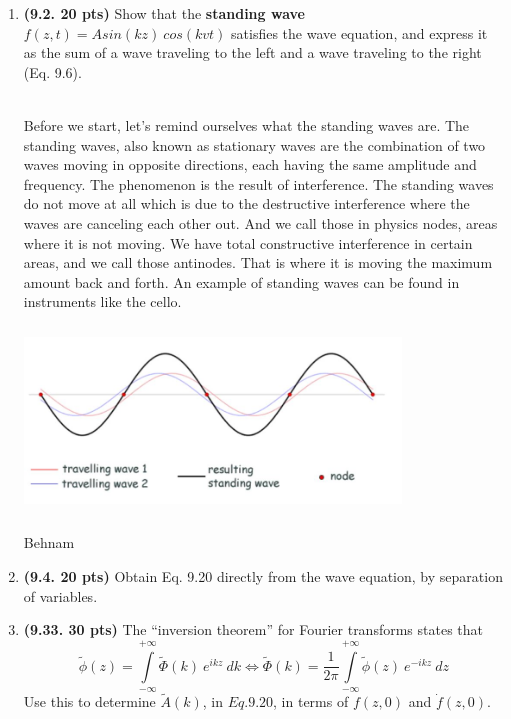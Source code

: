 \documentclass[fleqn]{article}
\begin{document}
  \begin{enumerate}
    \item \textbf{(9.2. 20 pts)} Show that the \textbf{standing wave} $f(z,t)=A sin(kz) ~ cos(kvt)$ satisfies
    the wave equation, and express it as the sum of a wave traveling to the left and a wave traveling to the 
    right (Eq. 9.6).

      \textcolor{hwColor}{
        \\
        Before we start, let's remind ourselves what the standing waves are. The standing waves, also known as stationary waves
        are the combination of two waves moving in opposite directions, each having the same amplitude and frequency. The 
        phenomenon is the result of interference. The standing waves do not move at all which is due to the destructive interference
        where the waves are canceling each other out. And we call those in physics nodes, areas where it is not moving. We have 
        total constructive interference in certain areas, and we call those antinodes. That is where it is moving the maximum
        amount back and forth. An example of standing waves can be found in instruments like the cello.
        \begin{center}
          \includegraphics[height=5cm, width=10cm]{QuestionOne.JPG}
        \end{center}
        Behnam
      }

    \item \textbf{(9.4. 20 pts)} Obtain Eq. 9.20 directly from the wave equation, by separation of variables.


    \item \textbf{(9.33. 30 pts)} The “inversion theorem” for Fourier transforms states that
    $$
      \tilde{\phi}(z)=\int\limits_{-\infty}^{+\infty} \tilde{\Phi}(k) ~ e^{ikz} ~ dk 
      \Longleftrightarrow 
      \tilde{\Phi}(k)=\dfrac{1}{2 \pi} \int\limits_{-\infty}^{+\infty} \tilde{\phi}(z) ~ e^{-ikz} ~ dz 
    $$
    Use this to determine $\tilde{A}(k)$, in $Eq. 9.20$, in terms of $f(z, 0)$ and $\dot{f}(z,0)$.


\end{enumerate}
\end{document}
